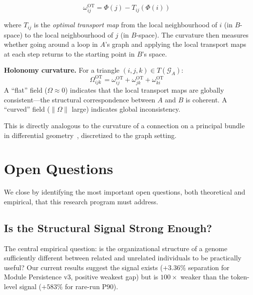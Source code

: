 \documentclass{../yalumba}
\begin{document}
\begin{equation}
  \omega_{ij}^{\mathrm{OT}} = \Phi(j) - T_{ij}(\Phi(i))
  \label{eq:ot_connection}
\end{equation}

where $T_{ij}$ is the \emph{optimal transport map} from the local
neighbourhood of $i$ (in $B$-space) to the local neighbourhood of $j$
(in $B$-space).  The curvature then measures whether going around
a loop in $A$'s graph and applying the local transport maps at each
step returns to the starting point in $B$'s space.

\begin{definition}
\textbf{Holonomy curvature.}  For a triangle $(i, j, k) \in
T(\mathcal{G}_A)$:
\begin{equation}
  \Omega_{ijk}^{\mathrm{OT}} = \omega_{ij}^{\mathrm{OT}}
  + \omega_{jk}^{\mathrm{OT}} + \omega_{ki}^{\mathrm{OT}}
  \label{eq:holonomy}
\end{equation}
A ``flat'' field ($\Omega \approx 0$) indicates that the local transport
maps are globally consistent---the structural correspondence between $A$
and $B$ is coherent.  A ``curved'' field ($\|\Omega\|$ large) indicates
global inconsistency.
\end{definition}

This is directly analogous to the curvature of a connection on a
principal bundle in differential geometry~\cite{nakahara2003geometry},
discretized to the graph setting.


\section{Open Questions}
\label{sec:openquestions}

We close by identifying the most important open questions, both
theoretical and empirical, that this research program must address.

\subsection{Is the Structural Signal Strong Enough?}
\label{sec:open:strength}

The central empirical question: is the organizational structure of a
genome sufficiently different between related and unrelated individuals
to be practically useful?  Our current results suggest the signal
exists ($+3.36\%$ separation for Module Persistence v3, positive
weakest gap) but is $100\times$ weaker than the token-level signal
($+583\%$ for rare-run P90).
\end{document}
